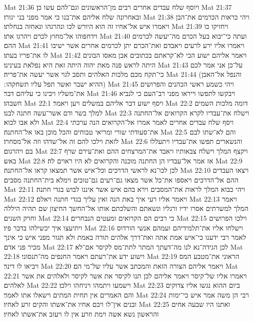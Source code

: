 Mat 21:36  ויוסף שלח עבדים אחרים רבים מן־הראשונים וגם־להם עשו כן׃
Mat 21:37  ובאחרונה שלח אליהם את־בנו כי אמר מפני בני יגורו׃
Mat 21:38  ויהי כראות הכרמים את־הבן ויאמרו איש אל־אחיו זה הוא היורש לכו ונהרגהו ונאחזה בנחלתו׃
Mat 21:39  ויחזיקו בו וידחפוהו אל־מחוץ לכרם ויהרגו אתו׃
Mat 21:40  ועתה כי־יבוא בעל הכרם מה־יעשה לכרמים ההם׃
Mat 21:41  ויאמרו אליו ירע לרעים ויאבדם ואת־הכרם יתן לכרמים אחרים אשר ישיבו לו את־פריו בעתו׃
Mat 21:42  ויאמר אליהם ישוע הכי לא־קראתם בכתובים אבן מאסו הבונים היתה לראש פנה מאת יהוה היתה זאת היא נפלאת בעינינו׃
Mat 21:43  על־כן אני אמר לכם כי־תקח מכם מלכות האלהים ותסב לגוי אשר יעשה את־פריה׃
Mat 21:44  (והנפל אל־האבן ההיא ישבר ואשר תפל עליו תשחקהו ׃)
Mat 21:45  ויהי כשמע ראשי הכהנים והפרושים את־משליו ויבינו כי עליהם דבר׃
Mat 21:46  ויבקשו לתפשו וייראו מפני רב־העם כי לנביא חשבהו׃
Mat 22:1  ויסף ישוע דבר אליהם במשלים ויען ויאמר׃
Mat 22:2  דומה מלכות השמים למלך בשר ודם אשר־עשה חתנה לבנו׃
Mat 22:3  וישלח את־עבדיו לקרא הקרואים אל־החתנה ולא אבו לבוא׃
Mat 22:4  ויסף שלח עבדים אחרים לאמר אמרו אל־הקרואים הנה ערכתי את־סעודתי שורי ומריאי טבוחים והכל מוכן באו אל־החתנה׃
Mat 22:5  והם לא־שתו לבם לזאת וילכו להם זה אל־שדהו וזה אל־מסחרו׃
Mat 22:6  והנשארים תפשו את־עבדיו ויתעללו בם ויהרגום׃
Mat 22:7  ויקצף המלך וישלח צבאותיו ויאבד את־המרצחים ההם ואת־עירם שרף באש׃
Mat 22:8  אז אמר אל־עבדיו הן החתנה מוכנה והקרואים לא היו ראוים לה׃
Mat 22:9  לכן לכו־נא לראשי הדרכים וכל־איש אשר תמצאו קראו אל־החתנה׃
Mat 22:10  ויצאו העבדים ההם אל־הדרכים ויאספו את־כל אשר מצאו גם־רעים גם־טובים וימלא בית־החתנה מסבים׃
Mat 22:11  ויהי כבוא המלך לראות את־המסבים וירא בהם איש אשר איננו לבוש בגדי חתנה׃
Mat 22:12  ויאמר אליו רעי איך באת הנה ואין עליך בגדי חתנה ויאלם׃
Mat 22:13  ויאמר המלך למשרתים אסרו ידיו ורגליו ונשאתם והשלכתם אותו אל־החשך החיצון שם תהיה היללה וחרק השנים׃
Mat 22:14  כי רבים הם הקרואים ומעטים הנבחרים׃
Mat 22:15  וילכו הפרושים ויתיעצו איך יכשילהו בדבר פיו׃
Mat 22:16  וישלחו אליו את־תלמידיהם ועמהם אנשי הורדוס לאמר רבי ידענו כי־איש אמת אתה ואת־דרך אלהים תורה באמת ולא תגור מפני איש כי אינך מכיר פני אדם׃
Mat 22:17  לכן הגידה־נא לנו מה־דעתך המתר לתת־מס לקיסר אם־לא׃
Mat 22:18  וישוע ידע את־רעתם ויאמר החנפים מה־תנסוני׃
Mat 22:19  הראוני את־מטבע המס ויביאו לו דינר׃
Mat 22:20  ויאמר אליהם הצורה הזאת והמכתב אשר עליו של־מי הם׃
Mat 22:21  ויאמרו אליו של־קיסר ויאמר אליהם לכן תנו לקיסר את אשר לקיסר ולאלהים את אשר לאלהים׃
Mat 22:22  וישמעו ויתמהו ויניחהו וילכו׃
Mat 22:23  ביום ההוא נגשו אליו צדוקים והם האמרים אין תחית המתים וישאלו אתו לאמר׃
Mat 22:24  רבי הן משה אמר איש כי־ימות ובנים אין־לו ויבם אחיו את־אשתו והקים זרע לאחיו׃
Mat 22:25  ואתנו היו שבעה אחים והראשון נשא אשה וימת וזרע אין לו ויעזב את־אשתו לאחיו׃

